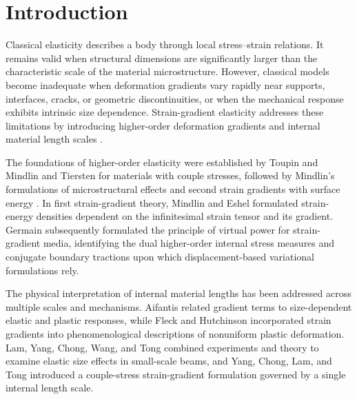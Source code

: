 \documentclass[preprint,12pt]{elsarticle}
\begin{document}
\section{Introduction}

\label{sec:introduction}

Classical elasticity describes a body through local stress--strain
relations. It remains valid when structural dimensions are significantly
larger than the characteristic scale of the material microstructure.
However, classical models become inadequate when deformation gradients vary
rapidly near supports, interfaces, cracks, or geometric discontinuities, or
when the mechanical response exhibits intrinsic size dependence.
Strain-gradient elasticity addresses these limitations by introducing
higher-order deformation gradients and internal material length scales
\cite{Aifantis1999,AskesAifantis2002,LamYangChongWangTong2003,AskesAifantis2011}.

The foundations of higher-order elasticity were established by Toupin
\cite{Toupin1962} and Mindlin and Tiersten \cite{MindlinTiersten1962} for
materials with couple stresses, followed by Mindlin's formulations of
microstructural effects \cite{Mindlin1964} and second strain gradients with
surface energy \cite{Mindlin1965}. In first strain-gradient theory,
Mindlin and Eshel \cite{MindlinEshel1968} formulated strain-energy
densities dependent on the infinitesimal strain tensor and its gradient.
Germain \cite{Germain1973} subsequently formulated the principle of
virtual power for strain-gradient media, identifying the dual higher-order
internal stress measures and conjugate boundary tractions upon which
displacement-based variational formulations rely.

The physical interpretation of internal material lengths has been
addressed across multiple scales and mechanisms. Aifantis \cite{Aifantis1999}
related gradient terms to size-dependent elastic and plastic responses, while
Fleck and Hutchinson \cite{FleckHutchinson1993,FleckMullerAshbyHutchinson1994,FleckHutchinson1997}
incorporated strain gradients into phenomenological descriptions of
nonuniform plastic deformation. Lam, Yang, Chong, Wang, and Tong
\cite{LamYangChongWangTong2003} combined experiments and theory to examine
elastic size effects in small-scale beams, and Yang, Chong, Lam, and Tong
\cite{YangChongLamTong2002} introduced a couple-stress strain-gradient
formulation governed by a single internal length scale.
\end{document}
